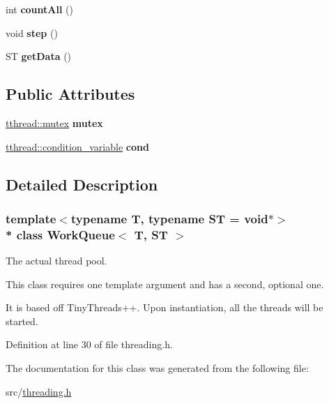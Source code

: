 \begin{DoxyCompactItemize}
\item 
int {\bfseries count\+All} ()\hypertarget{class_work_queue_a999763b5cd4a46a7c85314b54ce76d20}{}\label{class_work_queue_a999763b5cd4a46a7c85314b54ce76d20}

\item 
void {\bfseries step} ()\hypertarget{class_work_queue_a226392ae85100777be0eeb1ab6419470}{}\label{class_work_queue_a226392ae85100777be0eeb1ab6419470}

\item 
ST {\bfseries get\+Data} ()\hypertarget{class_work_queue_a62afbedf319665c6b28198d040a04a80}{}\label{class_work_queue_a62afbedf319665c6b28198d040a04a80}

\end{DoxyCompactItemize}
\subsection*{Public Attributes}
\begin{DoxyCompactItemize}
\item 
\hyperlink{classtthread_1_1mutex}{tthread\+::mutex} {\bfseries mutex}\hypertarget{class_work_queue_a6ff6898f973d52547504c667c6d73ee0}{}\label{class_work_queue_a6ff6898f973d52547504c667c6d73ee0}

\item 
\hyperlink{classtthread_1_1condition__variable}{tthread\+::condition\+\_\+variable} {\bfseries cond}\hypertarget{class_work_queue_a2f74d2aaba1734d35378b51175146e04}{}\label{class_work_queue_a2f74d2aaba1734d35378b51175146e04}

\end{DoxyCompactItemize}


\subsection{Detailed Description}
\subsubsection*{template$<$typename T, typename ST = void$\ast$$>$\\*
class Work\+Queue$<$ T, S\+T $>$}

The actual thread pool. 

This class requires one template argument and has a second, optional one.

It is based off Tiny\+Threads++. Upon instantiation, all the threads will be started. 

Definition at line 30 of file threading.\+h.



The documentation for this class was generated from the following file\+:\begin{DoxyCompactItemize}
\item 
src/\hyperlink{threading_8h}{threading.\+h}\end{DoxyCompactItemize}
